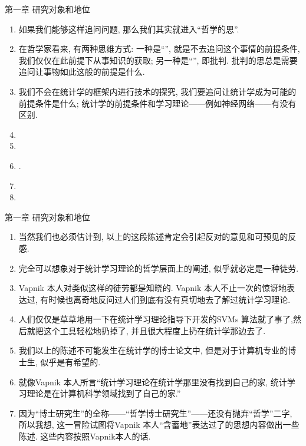 \documentclass[compress,10pt,dvipsnames,notheorems]{beamer} %
\begin{document}
\begin{frame}{第一章 研究对象和地位}
\begin{solu}
\begin{enumerate}
\item 如果我们能够这样追问问题, 那么我们其实就进入“哲学的思”.
\item 在哲学家看来, 有两种思维方式: 一种是“{\color{red}{自然的思}}”, 就是不去追问这个事情的前提条件, 我们仅仅在此前提下从事知识的获取; 另一种是“{\color{red}{哲学的思}}”, 即批判. 批判的思总是需要追问让事物如此这般的前提是什么.
\item {\color{red}{本论文讨论的是“哲学的思”.}} 我们不会在统计学的框架内进行技术的探究, 我们要追问让统计学成为可能的前提条件是什么; 统计学的前提条件和学习理论——例如神经网络——有没有区别.
\pause
\item {\color{red}{本论文的目的是揭示统计学思想上的天真和无头脑.}}
\pause
\item {\color{red}{本论文的不是通过我自己的话来解释统计学的无头脑, 而只不过是翻译了一下统计学家自己的语言而已, 但是为何国内的所谓那些著名统计学家们要沉默呢?}}
\pause
\item {\color{red}{本论文并不想叫醒那些沉睡的统计学家, 而是为我们自己搞清楚问题, 以便使得我们自己不要再错下去}}.
\item {\color{red}{要做到这一点极其艰难, 不仅仅是因为我先前所受的教育正就是统计学, 更大的原因是此论文标示着一种和当下主流知识类型的决断.}}
\item {\color{red}{实现的这一目的的方法是对比统计学与统计学习理论.}}
\end{enumerate}
\end{solu}
\end{frame}

\begin{frame}{第一章 研究对象和地位}
\begin{solu}
\begin{enumerate}
\item 当然我们也必须估计到, 以上的这段陈述肯定会引起反对的意见和可预见的反感.
\item 完全可以想象对于统计学习理论的哲学层面上的阐述, 似乎就必定是一种徒劳.
\pause
\item Vapnik 本人对类似这样的徒劳都是知晓的. Vapnik 本人不止一次的惊讶地表达过, 有时候也离奇地反问过人们到底有没有真切地去了解过统计学习理论.
\item 人们仅仅是草草地用一下在统计学习理论指导下开发的SVMs 算法就了事了,然后就把这个工具轻松地扔掉了, 并且很大程度上扔在统计学那边去了.
\pause
\item 我们以上的陈述不可能发生在统计学的博士论文中, 但是对于计算机专业的博士生, 似乎是有希望的.
\item 就像Vapnik 本人所言“统计学习理论在统计学那里没有找到自己的家, 统计学习理论是在计算机科学领域找到了自己的家.”
\pause
\item 因为“博士研究生”的全称——“哲学博士研究生”——还没有抛弃“哲学”二字, 所以我想{\color{red}{冒险一试}}, 这一冒险试图将Vapnik 本人“含蓄地”表达过了的思想内容做出一些陈述. 这些内容按照Vapnik本人的话{\color{red}{“是比技术更加重要的”}}.
\end{enumerate}
\end{solu}
\end{frame}
\end{document}
